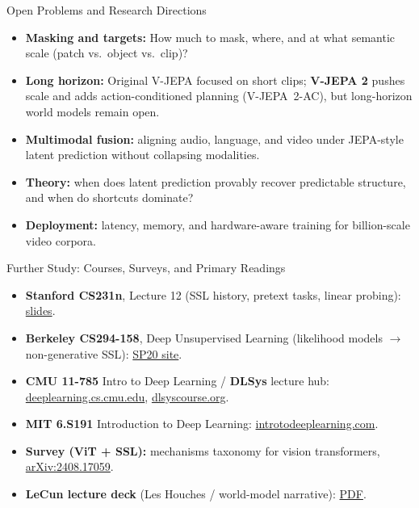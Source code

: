 \begin{frame}{Open Problems and Research Directions}
  \begin{itemize}\itemsep0.28em
    \item \textbf{Masking and targets:} How much to mask, where, and at what semantic scale (patch vs.\ object vs.\ clip)?
    \item \textbf{Long horizon:} Original V-JEPA focused on short clips; \textbf{V-JEPA 2} pushes scale and adds action-conditioned planning (V-JEPA~2-AC), but long-horizon world models remain open.
    \item \textbf{Multimodal fusion:} aligning audio, language, and video under JEPA-style latent prediction without collapsing modalities.
    \item \textbf{Theory:} when does latent prediction provably recover predictable structure, and when do shortcuts dominate?
    \item \textbf{Deployment:} latency, memory, and hardware-aware training for billion-scale video corpora.
  \end{itemize}
\end{frame}

\begin{frame}{Further Study: Courses, Surveys, and Primary Readings}
  \footnotesize
  \begin{itemize}\itemsep0.22em
    \item[\textcolor{red}{$\blacktriangleright$}] \textbf{Stanford CS231n}, Lecture 12 (SSL history, pretext tasks, linear probing): \href{https://cs231n.stanford.edu/2024/slides/2024/lecture_12.pdf}{slides}.
    \item[\textcolor{red}{$\blacktriangleright$}] \textbf{Berkeley CS294-158}, Deep Unsupervised Learning (likelihood models $\rightarrow$ non-generative SSL): \href{https://sites.google.com/view/berkeley-cs294-158-sp20/home}{SP20 site}.
    \item[\textcolor{red}{$\blacktriangleright$}] \textbf{CMU 11-785} Intro to Deep Learning / \textbf{DLSys} lecture hub: \href{https://deeplearning.cs.cmu.edu/}{deeplearning.cs.cmu.edu}, \href{https://dlsyscourse.org/lectures/}{dlsyscourse.org}.
    \item[\textcolor{red}{$\blacktriangleright$}] \textbf{MIT 6.S191} Introduction to Deep Learning: \href{https://introtodeeplearning.com/}{introtodeeplearning.com}.
    \item[\textcolor{red}{$\blacktriangleright$}] \textbf{Survey (ViT + SSL):} mechanisms taxonomy for vision transformers, \href{https://arxiv.org/abs/2408.17059}{arXiv:2408.17059}.
    \item[\textcolor{red}{$\blacktriangleright$}] \textbf{LeCun lecture deck} (Les Houches / world-model narrative): \href{https://leshouches2022.github.io/SLIDES/lecun-20220720-leshouches-03.pdf}{PDF}.
  \end{itemize}
\end{frame}

